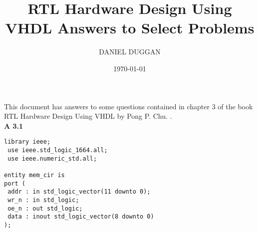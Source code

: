 \documentclass{article}
\title{RTL Hardware Design Using VHDL Answers to Select Problems}
\author{\uppercase{Daniel Duggan}}
\date{\today}   %
\begin{document}
\maketitle    %




This document has answers to some questions contained in chapter 3 of the book RTL Hardware Design Using VHDL 
by Pong P. Chu. \cite{chu2006rtl}.  \\

\textbf{A 3.1} \\

\begin{lstlisting}[style=vhdlstyle]
 library ieee;
 use ieee.std_logic_1664.all;
 use ieee.numeric_std.all; 

entity mem_cir is 
port (
 addr : in std_logic_vector(11 downto 0); 
 wr_n : in std_logic; 
 oe_n : out std_logic; 
 data : inout std_logic_vector(8 downto 0) 
);
\end{lstlisting}



\end{document}
